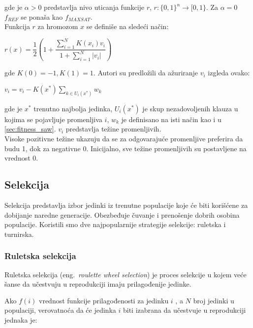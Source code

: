 \documentclass{article}
\begin{document}
gde je $\alpha > 0 $ predstavlja nivo uticanja funkcije $r$, $ r : \lbrace 0, 1 \rbrace ^ n \rightarrow [0, 1 \rbrace $. 
Za $\alpha = 0 $ $f_{REF} $ se ponaša kao $f_{MAXSAT} $. \\

Funkcija $r$ za hromozom $x$ se definiše na sledeći način:

\begin{center}
$r(x) = \dfrac{1}{2} ( 1 + \dfrac{\sum_{i=1}^{N} K(x_i) v_i} {1+ \sum_{i=1}^{N} |v_i|})$
\end{center}

gde  $ K(0) = -1, K(1) = 1 $. Autori su predložili da ažuriranje $v_i$  izgleda ovako:
 
\begin{center}
	$ v_i = v_i - K(x^*) \sum_{k \in U_i(x^*)} w_k $
\end{center}

gde je $x^*$ trenutno najbolja jedinka, $U_i (x^*)$ je skup nezadovoljenih klauza u kojima se pojavljuje promenljiva $i$, $w_k$ je definisano na isti način kao i u \ref{sec:fitness_saw}. $v_i$ predstavlja težine promenljivih.\\

Visoke pozitivne težine ukazuju da se za odgovarajuće promenljive preferira da budu 1, dok za negativne 0. Inicijalno, sve težine promenljivih su postavljene na vrednost 0.


\subsection{Selekcija}
\label{sec:ea_selekcija}
Selekcija predstavlja izbor jedinki iz trenutne populacije koje će biti korišćene za dobijanje naredne generacije. Obezbeđuje čuvanje i prenošenje dobrih osobina populacije. Koristili smo dve najpopularnije strategije selekcije: ruletska i turnirska.

\subsubsection{Ruletska selekcija}
\label{sec:ea_ruletska}
Ruletska selekcija (eng.~{\em roulette wheel selection}) \cite{vi_Janicic} je proces selekcije u kojem veće šanse da učestvuju u reprodukciji imaju prilagođenije jedinke.\

Ako $f(i)$ vrednost funkcije prilagođenosti za jedinku $i$ , a $N$ broj jedinki u populaciji, verovatnoća da će jedinka $i$ biti izabrana da učestvuje u reprodukciji jednaka je:
\end{document}
